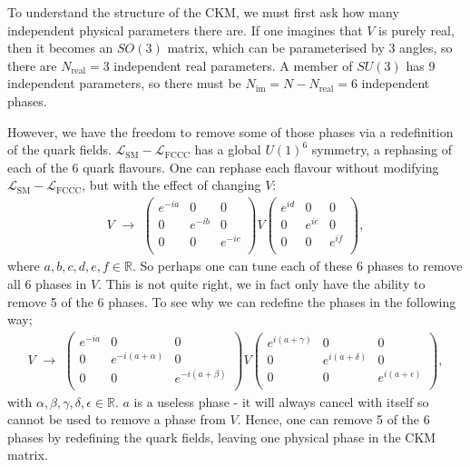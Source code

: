 To understand the structure of the CKM, we must first ask how many independent physical parameters there are. If one imagines that $V$ is purely real, then it becomes an $SO(3)$ matrix, which can be parameterised by 3 angles, so there are $N_{\text{real}} = 3$ independent real parameters. A member of $SU(3)$ has 9 independent parameters, so there must be $N_{\text{im}}=N-N_{\text{real}} = 6$ independent phases.

However, we have the freedom to remove some of those phases via a redefinition of the quark fields. $\mathcal{L}_{\text{SM}} - \mathcal{L}_{\text{FCCC}}$ has a global $U(1)^6$ symmetry, a rephasing of each of the 6 quark flavours. One can rephase each flavour without modifying $\mathcal{L}_{\text{SM}} - \mathcal{L}_{\text{FCCC}}$, but with the effect of changing $V$:
\begin{align}
  V \,\,\to \,\,
  \begin{pmatrix}
    e^{-ia} & 0 & 0 \\
    0 & e^{-ib} & 0 \\
    0 & 0 & e^{-ic} \\
  \end{pmatrix}
  V
  \begin{pmatrix}
    e^{id} & 0 & 0 \\
    0 & e^{ie} & 0 \\
    0 & 0 & e^{if} \\
  \end{pmatrix},
\end{align}
where $a,b,c,d,e,f\in \mathbb{R}$. So perhaps one can tune each of these 6 phases to remove all 6 phases in $V$. This is not quite right, we in fact only have the ability to remove 5 of the 6 phases. To see why we can redefine the phases in the following way;
\begin{align}
  V \,\,\to \,\,
  \begin{pmatrix}
    e^{-ia} & 0 & 0 \\
    0 & e^{-i(a+\alpha)} & 0 \\
    0 & 0 & e^{-i(a+\beta)} \\
  \end{pmatrix}
  V
  \begin{pmatrix}
    e^{i(a+\gamma)} & 0 & 0 \\
    0 & e^{i(a+\delta)} & 0 \\
    0 & 0 & e^{i(a+\epsilon)} \\
  \end{pmatrix},
\end{align}
with $\alpha,\beta,\gamma,\delta,\epsilon\in\mathbb{R}$. $a$ is a useless phase - it will always cancel with itself so cannot be used to remove a phase from $V$. Hence, one can remove 5 of the 6 phases by redefining the quark fields, leaving one physical phase in the CKM matrix.

